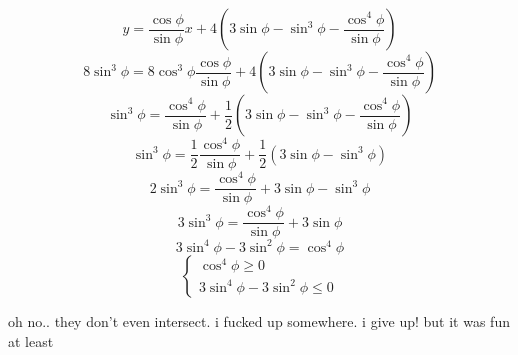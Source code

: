 \documentclass{article}
\begin{document}
  \[
    y = \frac{\cos\phi}{\sin \phi} x + 4\left(3 \sin \phi - \sin^3 \phi -\frac{\cos^4\phi}{\sin \phi}\right)
  \]
  \[
    8 \sin^3 \phi = 8 \cos^3 \phi \frac{\cos\phi}{\sin \phi} + 4\left(3 \sin \phi - \sin^3 \phi -\frac{\cos^4\phi}{\sin \phi}\right)
  \]
  \[
    \sin^3 \phi = \frac{\cos^4\phi}{\sin \phi} + \frac{1}{2}\left(3 \sin \phi - \sin^3 \phi -\frac{\cos^4\phi}{\sin \phi}\right)
  \]
  \[
    \sin^3 \phi = \frac{1}{2}\frac{\cos^4\phi}{\sin \phi} + \frac{1}{2}\left(3 \sin \phi - \sin^3 \phi\right)
  \]
  \[
    2\sin^3 \phi = \frac{\cos^4\phi}{\sin \phi} + 3 \sin \phi - \sin^3 \phi
  \]
  \[
    3\sin^3 \phi = \frac{\cos^4\phi}{\sin \phi} + 3 \sin \phi
  \]
  \[
    3\sin^4 \phi - 3 \sin^2 \phi = \cos^4\phi
  \]
  \[
    \begin{cases}
      \cos^4\phi \geq 0 \\
      3\sin^4 \phi - 3 \sin^2 \phi \leq 0
    \end{cases}
  \]

  oh no.. they don't even intersect. i fucked up somewhere. i give up! but it was fun at least
\end{document}
